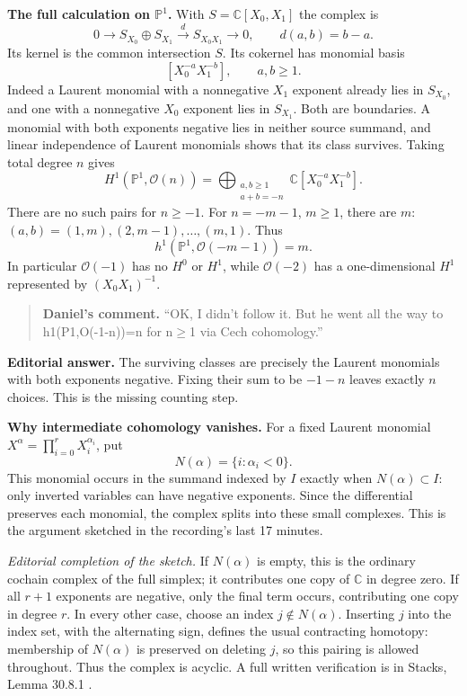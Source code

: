 \medskip\noindent
{\bf The full calculation on
$\mathbb{P}^1$.} With $S=\mathbb{C}[X_0,X_1]$
the complex is
$$
0\longrightarrow S_{X_0}\oplus S_{X_1}
\xrightarrow{\ d\ }S_{X_0X_1}
\longrightarrow0,
\qquad d(a,b)=b-a.
$$
Its kernel is the common intersection $S$.
Its cokernel has monomial basis
$$
[X_0^{-a}X_1^{-b}],\qquad a,b\geq1.
$$
Indeed a Laurent monomial with a
nonnegative $X_1$ exponent already lies in
$S_{X_0}$, and one with a nonnegative
$X_0$ exponent lies in $S_{X_1}$. Both are
boundaries. A monomial with both exponents
negative lies in neither source summand,
and linear independence of Laurent
monomials shows that its class survives.
Taking total degree $n$ gives
$$
H^1(\mathbb{P}^1,\mathcal{O}(n))
=\bigoplus_{\substack{a,b\geq1\\a+b=-n}}
\mathbb{C}[X_0^{-a}X_1^{-b}].
$$
There are no such pairs for $n\geq-1$.
For $n=-m-1$, $m\geq1$, there are $m$:
$(a,b)=(1,m),(2,m-1),\ldots,(m,1)$.
Thus
$$
h^1(\mathbb{P}^1,\mathcal{O}(-m-1))=m.
$$
In particular $\mathcal{O}(-1)$ has no
$H^0$ or $H^1$, while $\mathcal{O}(-2)$
has a one-dimensional $H^1$ represented
by $(X_0X_1)^{-1}$.

\begin{quote}
\textbf{Daniel's comment.}
``OK, I didn't follow it. But he went all
 the way to h1(P1,O(-1-n))=n for n\(\geq\)1
 via Cech cohomology.''
\end{quote}

\noindent
\textbf{Editorial answer.} The surviving
classes are precisely the Laurent monomials
with both exponents negative. Fixing their
sum to be $-1-n$ leaves exactly $n$ choices.
This is the missing counting step.

\medskip\noindent
{\bf Why intermediate cohomology vanishes.}
For a fixed Laurent monomial
$X^\alpha=\prod_{i=0}^rX_i^{\alpha_i}$, put
$$
N(\alpha)=\{i:\alpha_i<0\}.
$$
This monomial occurs in the summand indexed
by $I$ exactly when $N(\alpha)\subset I$:
only inverted variables can have negative
exponents. Since the differential preserves
each monomial, the complex splits into
these small complexes. This is the
argument sketched in the recording's last
17 minutes.

\textit{Editorial completion of the
sketch.} If $N(\alpha)$ is empty, this is
the ordinary cochain complex of the full
simplex; it contributes one copy of
$\mathbb{C}$ in degree zero. If all
$r+1$ exponents are negative, only the final
term occurs, contributing one copy in
degree $r$. In every other case, choose an
index $j\notin N(\alpha)$. Inserting $j$
into the index set, with the alternating
sign, defines the usual contracting
homotopy: membership of $N(\alpha)$ is
preserved on deleting $j$, so this pairing
is allowed throughout. Thus the complex
is acyclic. A full written verification
is in Stacks, Lemma 30.8.1
\cite{stacks-project}.

